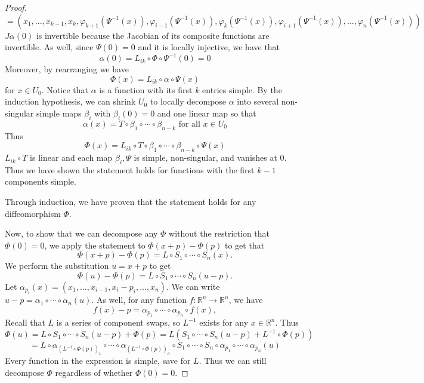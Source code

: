 \documentclass{article}
\theoremstyle{plain} %
\numberwithin{thm}{section} %
\theoremstyle{definition}
\begin{document}
\begin{proof}
\[        \]
        \[
            = (x_1, ..., x_{k-1} , x_k, \varphi _{k+1} (\Psi ^{-1}(x)), \varphi _{i-1} (\Psi ^{-1}(x)), \varphi _k (\Psi ^{-1}(x)), \varphi _{i+1} (\Psi ^{-1}(x)), ..., \varphi _n (\Psi ^{-1}(x)))
        \]
        \(J\alpha(0)\) is invertible because the Jacobian of its composite functions are invertible. As well, since \(\Psi (0) = 0\) and it is locally injective, we have that
        \[
            \alpha (0) = L_{ik} \circ \Phi \circ \Psi^{-1} (0) = 0
        \]
        Moreover, by rearranging we have
        \[
            \Phi (x) = L_{ik} \circ \alpha \circ \Psi (x)
        \]
        for \(x \in U_0\). Notice that \(\alpha\) is a function with its first \(k\) entries simple. By the induction hypothesis, we can shrink \(U_0\) to locally decompose \(\alpha\) into several non-singular simple maps \(\beta_i\) with \(\beta _i(0) = 0\) and one linear map so that
        \[
            \alpha (x) = T \circ \beta _1 \circ \cdots \circ \beta _{n-k} \text{ for all } x \in U_0
        \]
        Thus
        \[
            \Phi (x) = L_{ik} \circ T \circ \beta _1 \circ \cdots \circ \beta _{n-k} \circ \Psi (x)
        \]
        \(L_{ik} \circ T\) is linear and each map \(\beta _i, \Psi\) is simple, non-singular, and vanishes at 0. Thus we have shown the statement holds for functions with the first \(k-1\) components simple.

        Through induction, we have proven that the statement holds for any diffeomorphism \(\Phi\).

        Now, to show that we can decompose any \(\Phi\) without the restriction that \(\Phi (0) = 0\), we apply the statement to \(\Phi (x + p) - \Phi (p)\) to get that
        \[
            \Phi (x + p) - \Phi (p) = L \circ S_1 \circ \cdots \circ S_n (x).
        \]
        We perform the substitution \(u = x + p\) to get
        \[
            \Phi (u) - \Phi (p) = L \circ S_1 \circ \cdots \circ S_n (u - p).
        \]
        Let \(\alpha _{p_i} (x) = (x_1, ..., x_{i-1} , x_i - p_i, ..., x_n)\). We can write \(u - p = \alpha _1 \circ \cdots \circ \alpha _n (u)\). As well, for any function \(f: \mathbb{R}^n \to \mathbb{R}^n\), we have
        \[
            f(x) - p = \alpha _{p_1} \circ \cdots \circ \alpha _{p_n} \circ f(x),
        \]
        Recall that \(L\) is a series of component swaps, so \(L^{-1}\) exists for any \(x \in \mathbb{R}^n\). Thus
        \[
            \Phi (u) = L \circ S_1 \circ \cdots \circ S_n (u - p) + \Phi (p)= L (S_1 \circ \cdots \circ S_n (u - p) + L^{-1} \circ \Phi (p)) 
        \]
        \[
            = L \circ \alpha _{(L^{-1} \circ \Phi (p))_1} \circ \cdots \circ \alpha _{(L^{-1} \circ \Phi (p))_n} \circ S_1 \circ \cdots \circ S_n \circ \alpha_{p_1} \circ \cdots \circ \alpha_{p_n} (u)
        \]
        Every function in the expression is simple, save for \(L\). Thus we can still decompose \(\Phi\) regardless of whether \(\Phi (0) = 0\).


\end{proof}
\end{document}
